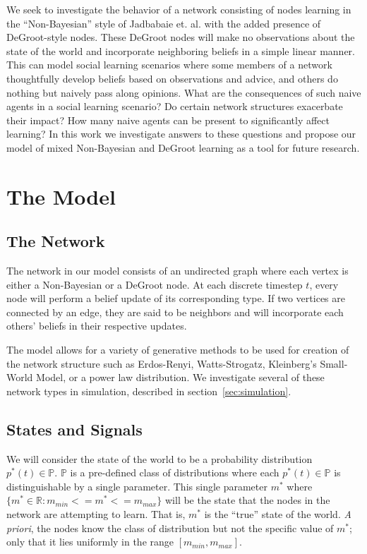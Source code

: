 \documentclass[letterpaper, 11pt, conference]{ieeeconf}
\begin{document}
We seek to investigate the behavior of a network consisting of nodes learning in the ``Non-Bayesian'' style of Jadbabaie et. al. with the added presence of DeGroot-style nodes.  These DeGroot nodes will make no observations about the state of the world and incorporate neighboring beliefs in a simple linear manner.  This can model social learning scenarios where some members of a network thoughtfully develop beliefs based on observations and advice, and others do nothing but naively pass along opinions.  What are the consequences of such naive agents in a social learning scenario?  Do certain network structures exacerbate their impact?  How many naive agents can be present to significantly affect learning?  In this work we investigate answers to these questions and propose our model of mixed Non-Bayesian and DeGroot learning as a tool for future research.

\section{The Model}

\subsection{The Network}

The network in our model consists of an undirected graph where each vertex is either a Non-Bayesian or a DeGroot node.  At each discrete timestep $t$, every node will perform a belief update of its corresponding type.  If two vertices are connected by an edge, they are said to be neighbors and will incorporate each others' beliefs in their respective updates.

The model allows for a variety of generative methods to be used for creation of the network structure such as Erdos-Renyi, Watts-Strogatz, Kleinberg's Small-World Model, or a power law distribution.  We investigate several of these network types in simulation, described in section~\ref{sec:simulation}.

\subsection{States and Signals}

We will consider the state of the world to be a probability distribution $p^*(t) \in \mathbb{P}$.  $\mathbb{P}$ is a pre-defined class of distributions where each  $p^*(t) \in \mathbb{P}$ is distinguishable by a single parameter.  This single parameter $m^*$ where $\{m^* \in \mathbb{R}: m_{min} <= m^* <= m_{max} \}$  will be the state that the nodes in the network are attempting to learn.  That is, $m^*$ is the ``true'' state of the world.  \emph{A priori}, the nodes know the class of distribution but not the specific value of $m^*$; only that it lies uniformly in the range $[m_{min}, m_{max}]$.
\end{document}
